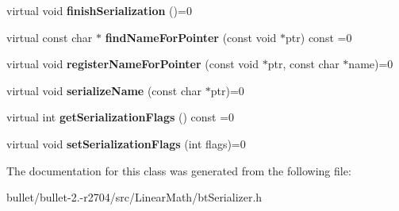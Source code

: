 \begin{DoxyCompactItemize}
\item 
\hypertarget{classbt_serializer_a73de9ac3f916608e26ea0f5f16939abc}{virtual void {\bfseries finish\+Serialization} ()=0}\label{classbt_serializer_a73de9ac3f916608e26ea0f5f16939abc}

\item 
\hypertarget{classbt_serializer_a1486d0a4683e152dd3f17a083d8e88f7}{virtual const char $\ast$ {\bfseries find\+Name\+For\+Pointer} (const void $\ast$ptr) const =0}\label{classbt_serializer_a1486d0a4683e152dd3f17a083d8e88f7}

\item 
\hypertarget{classbt_serializer_af4e2e226d06cd9264df03431fc376f25}{virtual void {\bfseries register\+Name\+For\+Pointer} (const void $\ast$ptr, const char $\ast$name)=0}\label{classbt_serializer_af4e2e226d06cd9264df03431fc376f25}

\item 
\hypertarget{classbt_serializer_a6f412ae1276a14cc818f4fd6b3cf167c}{virtual void {\bfseries serialize\+Name} (const char $\ast$ptr)=0}\label{classbt_serializer_a6f412ae1276a14cc818f4fd6b3cf167c}

\item 
\hypertarget{classbt_serializer_a634cc0d456c8d5bb2e2d242faf192787}{virtual int {\bfseries get\+Serialization\+Flags} () const =0}\label{classbt_serializer_a634cc0d456c8d5bb2e2d242faf192787}

\item 
\hypertarget{classbt_serializer_a1f46d70e6fd62daaccedc06073617203}{virtual void {\bfseries set\+Serialization\+Flags} (int flags)=0}\label{classbt_serializer_a1f46d70e6fd62daaccedc06073617203}

\end{DoxyCompactItemize}


The documentation for this class was generated from the following file\+:\begin{DoxyCompactItemize}
\item 
bullet/bullet-\/2.-\/r2704/src/\+Linear\+Math/bt\+Serializer.\+h\end{DoxyCompactItemize}
